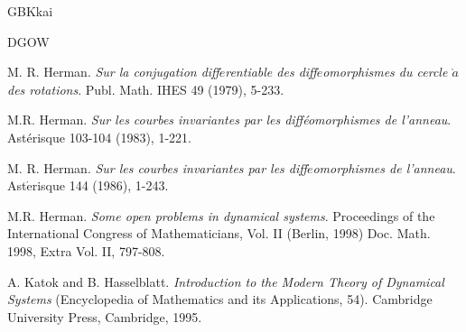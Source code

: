 \documentclass{amsart}
\theoremstyle{definition}
\begin{document}
\begin{CJK*}{GBK}{kai}
\begin{thebibliography}{DGOW}
			
			
			
			 M. R. Herman. {\it Sur la conjugation diff$\acute{e}$rentiable des diff$\acute{e}$omorphismes du cercle $\grave{a}$ des
				rotations}. Publ. Math. IHES {49} (1979), 5-233.
			
			
			 M.R. Herman. {\it Sur les courbes invariantes par les diff\'{e}omorphismes de
				l'anneau}. Ast\'{e}risque {103-104} (1983), 1-221.
			
			 M. R. Herman.  {\it Sur les courbes invariantes par les
				diff$\acute{e}$omorphismes de
				l'anneau}. Ast$\acute{\text{e}}$risque {144} (1986), 1-243.
			
			
			
			
			 M.R. Herman. {\it Some open problems in dynamical systems}.
			Proceedings of the International Congress of Mathematicians, Vol. II (Berlin, 1998)
			Doc. Math. 1998, Extra Vol. II, 797-808.
			
			
			
			
			
			 A. Katok and B. Hasselblatt. {\it Introduction to the Modern Theory of Dynamical Systems} (Encyclopedia of Mathematics and its Applications, 54). Cambridge University Press, Cambridge, 1995.
			

\end{thebibliography}
\end{CJK*}
\end{document}
